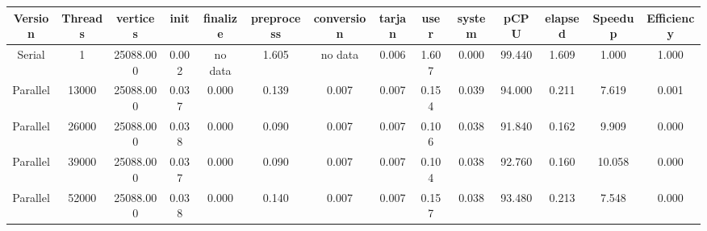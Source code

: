 \begin{tabular}{|c|c|c|c|c|c|c|c|c|c|c|c|c|c|}
\toprule
 Version &  Threads &  vertices &  init & finalize &  preprocess & conversion &  tarjan &  user &  system &   pCPU &  elapsed &  Speedup &  Efficiency \\
\midrule
  Serial &        1 & 25088.000 & 0.002 &  no data &       1.605 &    no data &   0.006 & 1.607 &   0.000 & 99.440 &    1.609 &    1.000 &       1.000 \\
Parallel &    13000 & 25088.000 & 0.037 &    0.000 &       0.139 &      0.007 &   0.007 & 0.154 &   0.039 & 94.000 &    0.211 &    7.619 &       0.001 \\
Parallel &    26000 & 25088.000 & 0.038 &    0.000 &       0.090 &      0.007 &   0.007 & 0.106 &   0.038 & 91.840 &    0.162 &    9.909 &       0.000 \\
Parallel &    39000 & 25088.000 & 0.037 &    0.000 &       0.090 &      0.007 &   0.007 & 0.104 &   0.038 & 92.760 &    0.160 &   10.058 &       0.000 \\
Parallel &    52000 & 25088.000 & 0.038 &    0.000 &       0.140 &      0.007 &   0.007 & 0.157 &   0.038 & 93.480 &    0.213 &    7.548 &       0.000 \\
\bottomrule
\end{tabular}
